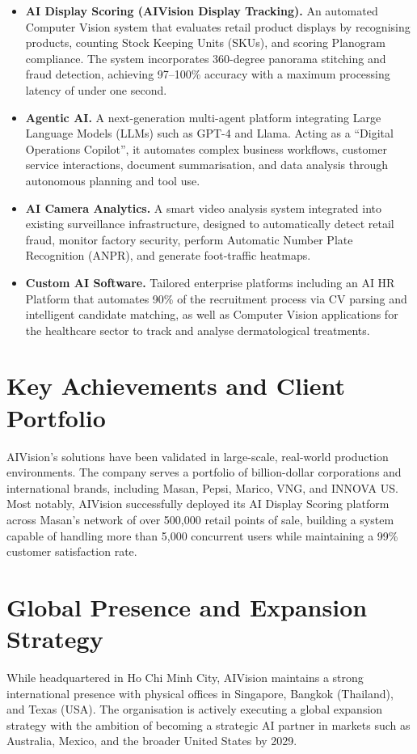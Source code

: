 \begin{itemize}
    \item \textbf{AI Display Scoring (AIVision Display Tracking).} An automated Computer Vision system that evaluates retail product displays by recognising products, counting Stock Keeping Units (SKUs), and scoring Planogram compliance. The system incorporates 360-degree panorama stitching and fraud detection, achieving 97–100\% accuracy with a maximum processing latency of under one second.

    \item \textbf{Agentic AI.} A next-generation multi-agent platform integrating Large Language Models (LLMs) such as GPT-4 and Llama. Acting as a ``Digital Operations Copilot'', it automates complex business workflows, customer service interactions, document summarisation, and data analysis through autonomous planning and tool use.

    \item \textbf{AI Camera Analytics.} A smart video analysis system integrated into existing surveillance infrastructure, designed to automatically detect retail fraud, monitor factory security, perform Automatic Number Plate Recognition (ANPR), and generate foot-traffic heatmaps.

    \item \textbf{Custom AI Software.} Tailored enterprise platforms including an AI HR Platform that automates 90\% of the recruitment process via CV parsing and intelligent candidate matching, as well as Computer Vision applications for the healthcare sector to track and analyse dermatological treatments.
\end{itemize}

\section{Key Achievements and Client Portfolio}

AIVision's solutions have been validated in large-scale, real-world production environments. The company serves a portfolio of billion-dollar corporations and international brands, including Masan, Pepsi, Marico, VNG, and INNOVA US. Most notably, AIVision successfully deployed its AI Display Scoring platform across Masan's network of over 500,000 retail points of sale, building a system capable of handling more than 5,000 concurrent users while maintaining a 99\% customer satisfaction rate.

\section{Global Presence and Expansion Strategy}

While headquartered in Ho Chi Minh City, AIVision maintains a strong international presence with physical offices in Singapore, Bangkok (Thailand), and Texas (USA). The organisation is actively executing a global expansion strategy with the ambition of becoming a strategic AI partner in markets such as Australia, Mexico, and the broader United States by 2029.
